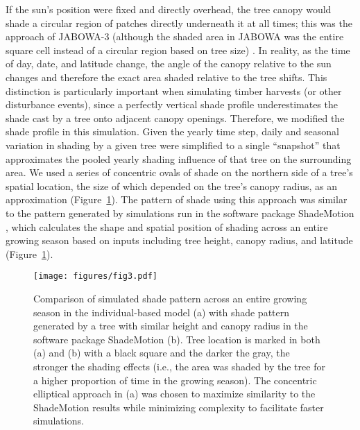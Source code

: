 \documentclass[
11pt, %
a4paper, %
oneside, %
headinclude,footinclude, %
]{scrartcl}
\begin{document}
If the sun’s position were fixed and directly overhead, the tree canopy would shade a circular region of patches directly underneath it at all times; this was the approach of JABOWA-3 (although the shaded area in JABOWA was the entire square cell instead of a circular region based on tree size) \citep{Botkin1993}. In reality, as the time of day, date, and latitude change, the angle of the canopy relative to the sun changes and therefore the exact area shaded relative to the tree shifts. This distinction is particularly important when simulating timber harvests (or other disturbance events), since a perfectly vertical shade profile underestimates the shade cast by a tree onto adjacent canopy openings. Therefore, we modified the shade profile in this simulation. Given the yearly time step, daily and seasonal variation in shading by a given tree were simplified to a single “snapshot” that approximates the pooled yearly shading influence of that tree on the surrounding area. We used a series of concentric ovals of shade on the northern side of a tree’s spatial location, the size of which depended on the tree’s canopy radius, as an approximation (Figure~\ref{fig:3}). The pattern of shade using this approach was similar to the pattern generated by simulations run in the software package ShadeMotion \citep{Quesada2010}, which calculates the shape and spatial position of shading across an entire growing season based on inputs including tree height, canopy radius, and latitude (Figure~\ref{fig:3}).

\begin{figure}
	\centering
	\texttt{[image: figures/fig3.pdf]}
	\caption{Comparison of simulated shade pattern across an entire growing season in the individual-based model (a) with shade pattern generated by a tree with similar height and canopy radius in the software package ShadeMotion (b). Tree location is marked in both (a) and (b) with a black square and the darker the gray, the stronger the shading effects (i.e., the area was shaded by the tree for a higher proportion of time in the growing season). The concentric elliptical approach in (a) was chosen to maximize similarity to the ShadeMotion results while minimizing complexity to facilitate faster simulations.}
	\label{fig:3}
\end{figure}
\end{document}
